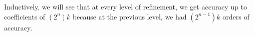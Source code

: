 \documentclass[12pt]{article}
\begin{document}
    Inductively, we will see that at every level of refinement, we get accuracy up to coefficients of $(2^n) k$ because at the previous level, we had $(2^{n-1}) k$ orders of accuracy.
    
    
    
    
    
    
    
    





{\footnotesize



}
\end{document}
